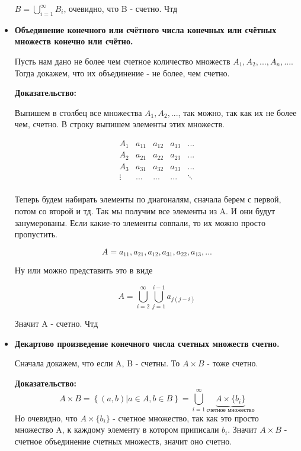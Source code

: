 \begin{itemize}
$B = \bigcup\limits_{i = 1}^{\infty} B_i$, очевидно, что B - счетно. Чтд\\

\item \textbf{Объединение конечного или счётного числа конечных или счётных множеств конечно или счётно.}

Пусть нам дано не более чем счетное количество множеств $A_1, A_2, ..., A_n, ...$. Тогда докажем, что их объединение -
не более, чем счетно.

\noindent \textbf{Доказательство:}

Выпишем в столбец все множества $A_1, A_2, ...$, так можно, так как их не более чем, счетно. В строку выпишем элементы
этих множеств.

\begin{equation*}
    \begin{array}{c|cccc}
        A_1 & a_{11} & a_{12} & a_{13} & ...\\
        A_2 & a_{21} & a_{22} & a_{23} & ...\\
        A_3 & a_{31} & a_{32} & a_{33} & ...\\
        \vdots & ... & ... & ... & \ddots\\
    \end{array}
\end{equation*}

Теперь будем набирать элементы по диагоналям, сначала берем с первой, потом со второй и тд. Так мы получим все элементы из A.
И они будут занумерованы. Если какие-то элементы совпали, то их можно просто пропустить.

\begin{equation*}
    A = a_{11}, a_{21}, a_{12}, a_{31}, a_{22}, a_{13}, ...
\end{equation*}

Ну или можно представить это в виде

\begin{equation*}
    A = \bigcup\limits_{i = 2}^{\infty} \bigcup\limits_{j = 1}^{i - 1} a_{j (j - i)}
\end{equation*}

Значит A - счетно. Чтд\\

\item \textbf{Декартово произведение конечного числа счетных множеств счетно.}

Сначала докажем, что если A, B - счетны. То $A \times B$ - тоже счетно.

\noindent \textbf{Доказательство:}
\begin{equation*}
    A \times B = \left\{ (a, b) | a \in A, b \in B \right\} = \bigcup\limits_{i = 1}^{\infty} \underbrace{A \times \{b_i\}}_{\text{счетное множество}}
\end{equation*}
Но очевидно, что $A \times \{b_i\}$ - счетное множество, так как это просто множество A, к каждому элементу в котором приписали $b_i$. Значит
$A \times B$ - счетное объединение счетных множеств, значит оно счетно.


\end{itemize}
